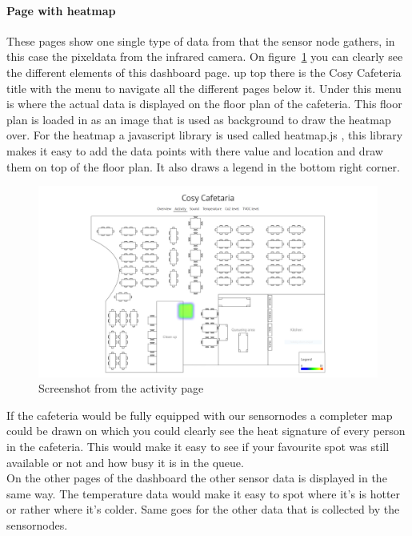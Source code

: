 \documentclass[11pt,a4paper]{article}
\begin{document}
\paragraph{Page with heatmap}
These pages show one single type of data from that the sensor node gathers, in this case the pixeldata from the infrared camera.
On figure~\ref{fig:heatmap_example} you can clearly see the different elements of this dashboard page. up top there is the Cosy Cafeteria title with the menu to navigate all the different pages below it.
Under this menu is where the actual data is displayed on the floor plan of the cafeteria. This floor plan is loaded in as an image that is used as background to draw the heatmap over.
For the heatmap a javascript library is used called heatmap.js \cite{heatmap.js}, this library makes it easy to add the data points with there value and location and draw them on top of the floor plan.
It also draws a legend in the bottom right corner.
\begin{figure}[H]
	\centering
	\includegraphics[width=1.0\linewidth]{heatmapExample.png}
	\caption{Screenshot from the activity page}
	\label{fig:heatmap_example}
\end{figure}
If the cafeteria would be fully equipped with our sensornodes a completer map could be drawn on which you could clearly see the heat signature of every person in the cafeteria.
This would make it easy to see if your favourite spot was still available or not and how busy it is in the queue.
\\
On the other pages of the dashboard the other sensor data is displayed in the same way. 
The temperature data would make it easy to spot where it's is hotter or rather where it's colder.
Same goes for the other data that is collected by the sensornodes.
\end{document}
